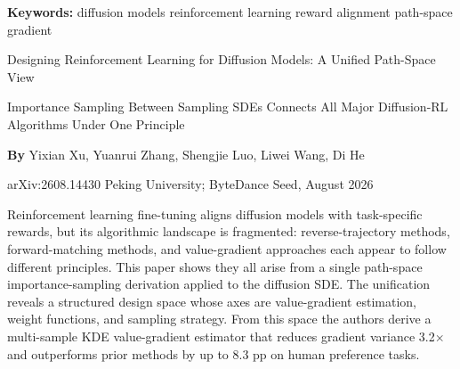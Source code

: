 \documentclass[10pt,twocolumn]{article}
\begin{document}
\setlength{\parindent}{0pt}
\setlength{\parskip}{4pt}

{\small\color{keywordgray}\textbf{Keywords:}
  diffusion models \textbullet{}
  reinforcement learning \textbullet{}
  reward alignment \textbullet{}
  path-space gradient}\par\vspace{4pt}

{\LARGE\bfseries\raggedright
  Designing Reinforcement Learning for
  Diffusion Models: A Unified Path-Space View}\par\vspace{4pt}

{\large\itshape\raggedright
  Importance Sampling Between Sampling SDEs Connects All
  Major Diffusion-RL Algorithms Under One Principle}\par\vspace{6pt}

{\small\textbf{By} Yixian Xu, Yuanrui Zhang, Shengjie Luo,
  Liwei Wang, Di He}\par\vspace{2pt}

{\small\color{keywordgray}arXiv:2608.14430 \textbullet{}
  Peking University; ByteDance Seed, August 2026}
\par\vspace{2pt}\noindent{\color{rulered}\rule{\columnwidth}{0.6pt}}\vspace{6pt}

Reinforcement learning fine-tuning aligns diffusion models with
task-specific rewards, but its algorithmic landscape is fragmented:
reverse-trajectory methods, forward-matching methods, and value-gradient
approaches each appear to follow different principles. This paper shows
they all arise from a single path-space importance-sampling derivation
applied to the diffusion SDE. The unification reveals a structured
design space whose axes are value-gradient estimation, weight functions,
and sampling strategy. From this space the authors derive a multi-sample
KDE value-gradient estimator that reduces gradient variance 3.2$\times$
and outperforms prior methods by up to 8.3 pp on human preference tasks.
\end{document}
